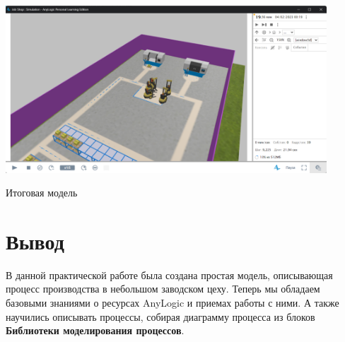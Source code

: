 \begin{image}
	\includegraphics[width=0.9\textwidth]{2023-04-02_16-02-41}
	\caption{Итоговая модель}
	\label{fig:model}
\end{image}

\clearpage

\section*{\LARGE Вывод}
В данной практической работе была создана простая модель, описывающая процесс
производства в небольшом заводском цеху. Теперь мы обладаем базовыми
знаниями о ресурсах AnyLogic и приемах работы с ними. А также научились
описывать процессы, собирая диаграмму процесса из блоков \textbf{Библиотеки
моделирования процессов}.

